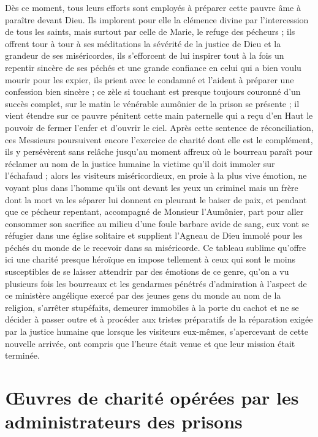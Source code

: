 \documentclass[11pt,a4paper]{report}
\begin{document}
Dès ce moment, tous leurs efforts sont employés à préparer cette pauvre âme à paraître devant Dieu. Ils implorent pour elle la clémence divine par l'intercession de tous les saints, mais surtout par celle de Marie, le refuge des pécheurs ; ils offrent tour à tour à ses méditations la sévérité de la justice de Dieu et la grandeur de ses miséricordes, ils s'efforcent de lui inspirer tout à la fois un repentir sincère de ses péchés et une grande confiance en celui qui a bien voulu mourir pour les expier, ils prient avec le condamné et l'aident à préparer une confession bien sincère ; ce zèle si touchant est presque toujours couronné d'un succès complet, sur le matin le vénérable aumônier de la prison se présente ; il vient étendre sur ce pauvre pénitent cette main paternelle qui a reçu d'en Haut le pouvoir de fermer l'enfer et d'ouvrir le ciel. Après cette sentence de réconciliation, ces Messieurs poursuivent encore l'exercice de charité dont elle est le complément, ils y persévèrent sans relâche jusqu'au moment affreux où le bourreau paraît pour réclamer au nom de la justice humaine la victime qu'il doit immoler sur l'échafaud ; alors les visiteurs miséricordieux, en proie à la plus vive émotion, ne voyant plus dans l'homme qu'ils ont devant les yeux un criminel mais un frère dont la mort va les séparer lui donnent en pleurant le baiser de paix, et pendant que ce pécheur repentant, accompagné de Monsieur l'Aumônier, part pour aller consommer son sacrifice au milieu d'une foule barbare avide de sang, eux vont se réfugier dans une église solitaire et supplient l'Agneau de Dieu immolé pour les péchés du monde de le recevoir dans sa miséricorde. Ce tableau sublime qu'offre ici une charité presque héroïque en impose tellement à ceux qui sont le moins susceptibles de se laisser attendrir par des émotions de ce genre, qu'on a vu plusieurs fois les bourreaux et les gendarmes pénétrés d'admiration à l'aspect de ce ministère angélique exercé par des jeunes gens du monde au nom de la religion, s'arrêter stupéfaits, demeurer immobiles à la porte du cachot et ne se décider à passer outre et à procéder aux tristes préparatifs de la réparation exigée par la justice humaine que lorsque les visiteurs eux-mêmes, s'apercevant de cette nouvelle arrivée, ont compris que l'heure était venue et que leur mission était terminée.

\section*{Œuvres de charité opérées par les administrateurs des prisons}
\end{document}
